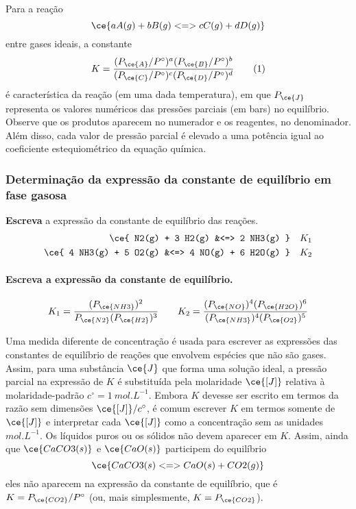 Para a reação \[
    \ce{ a A(g) + b B(g) <=> c C(g) + d D(g) }
\] entre gases ideais, a constante \[
    K = \dfrac{ (P_{\ce{A}}/P^\circ)^a (P_{\ce{B}}/P^\circ)^b }{ (P_{\ce{C}}/P^\circ)^c (P_{\ce{D}}/P^\circ)^d }
\tag{1}
\] é característica da reação (em uma dada temperatura), em que \(P_{\ce{J}}\) representa os valores numéricos das pressões parciais (em bars) no
equilíbrio. Observe que os produtos aparecem no numerador e os reagentes, no denominador. Além disso, cada valor de pressão parcial é elevado a uma
potência igual ao coeficiente estequiométrico da equação química.

\begin{example}

\subsubsection{Determinação da expressão da constante de equilíbrio em fase gasosa}

\textbf{Escreva} a expressão da constante de equilíbrio das reações. \[
\begin{aligned}
    \ce{ N2(g) + 3 H2(g) &<=> 2 NH3(g) } 
        && K_1 \\
    \ce{ 4 NH3(g) + 5 O2(g) &<=> 4 NO(g) + 6 H2O(g) } 
        && K_2
\end{aligned}
\]

\paragraph{Escreva a expressão da constante de equilíbrio.}

\[
    K_1 = \dfrac{ (P_{\ce{NH3}})^2 }{ P_{\ce{N2}} (P_{\ce{H2}})^3 } 
    \qquad
    K_2 = \dfrac{ (P_{\ce{NO}})^4 (P_{\ce{H2O}})^6 }{ (P_{\ce{NH3}})^4 (P_{\ce{O2}})^5 }
\]

\end{example}

Uma medida diferente de concentração é usada para escrever as expressões das constantes de equilíbrio de reações que envolvem espécies que não são
gases. Assim, para uma substância \(\ce{J}\) que forma uma solução ideal, a pressão parcial na expressão de \(K\) é substituída pela molaridade
\(\ce{[J]}\) relativa à molaridade-padrão \(c^\circ = \qty{1}{\unit{mol.L^{-1}}}\). Embora \(K\) devesse ser escrito em termos da razão sem dimensões
\(\ce{[J]}/c^\circ\), é comum escrever \(K\) em termos somente de \(\ce{[J]}\) e interpretar cada \(\ce{[J]}\) como a concentração sem as unidades
\(\unit{mol.L^{-1}}\). Os líquidos puros ou os sólidos não devem aparecer em \(K\). Assim, ainda que \(\ce{CaCO3(s)}\) e \(\ce{CaO(s)}\) participem do
equilíbrio \[
    \ce{ CaCO3(s) <=> CaO(s) + CO2(g) }
\] eles não aparecem na expressão da constante de equilíbrio, que é \(K = P_{\ce{CO2}}/P^\circ\) (ou, mais simplesmente, \(K = P_{\ce{CO2}}\)).

